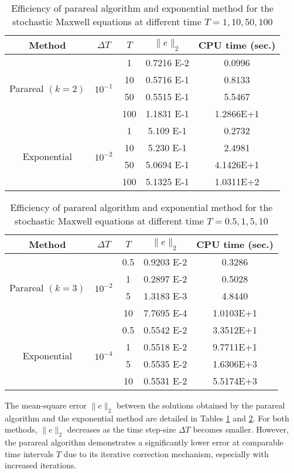 \documentclass[preprint,12pt]{elsarticle}
\begin{document}
\begin{table}[h]
	\centering
	\begin{tabular}{|c|c|c|c|c|}
		\hline Method &  $\Delta T$  & $T$ &  $\|e\|_{2}$  & CPU time (sec.) \\
		\hline \multirow{4}{*}{Parareal $(k=2)$}
		& \multirow{4}{*}{$10^{-1}$} & 1  & 0.7216 E-2 & 0.0996 \\
		& & 10 & 0.5716 E-1 & 0.8133 \\
		& & 50 & 0.5515 E-1 & 5.5467 \\
		& & 100 & 1.1831 E-1 & 1.2866E+1 \\
		\hline \multirow{4}{*}{Exponential} 
		& \multirow{4}{*}{$10^{-2}$} &  1  & 5.109 E-1 & 0.2732 \\
		& &  10 & 5.230 E-1 & 2.4981 \\
		& & 50  & 5.0694 E-1 & 4.1426E+1 \\
		& & 100 & 5.1325 E-1 & 1.0311E+2 \\
		\hline 
	\end{tabular}
	\caption{Efficiency of parareal algorithm  and exponential method for the stochastic Maxwell equations  at different time $T=1,10,50,100$}
	\label{table1}
\end{table}
\begin{table}[htbp]
	\centering
	\begin{tabular}{|c|c|c|c|c|}
		\hline Method &  $\Delta T$  & $T$ &  $\|e\|_{2}$  & CPU time (sec.) \\
		\hline \multirow{4}{*}{Parareal $(k=3)$}
		& \multirow{4}{*}{$10^{-2}$} & 0.5 & 0.9203 E-2 & 0.3286  \\
		& & 1  & 0.2897 E-2 & 0.5028\\
		& & 5  & 1.3183 E-3 & 4.8440 \\
		& & 10 & 7.7695 E-4 & 1.0103E+1\\
		\hline \multirow{4}{*}{Exponential} 
		& \multirow{4}{*}{$10^{-4}$} & 0.5 & 0.5542 E-2 & 3.3512E+1 \\
		& & 1  & 0.5518 E-2 & 9.7711E+1 \\
		& & 5  & 0.5535 E-2 & 1.6306E+3 \\
		& & 10 & 0.5531 E-2 & 5.5174E+3 \\
		\hline 
	\end{tabular}
	\caption{Efficiency of parareal algorithm  and exponential method for the stochastic Maxwell equations  at different time $T=0.5,1,5,10$}
	\label{table2}
\end{table}

The  mean-square error $\|e\|_2$ between the solutions obtained by the parareal algorithm and the exponential method are detailed in Tables \ref{table1} and \ref{table2}. For both methods, $\|e\|_2$ decreases as the time step-size $\Delta T$ becomes smaller. However, the parareal algorithm demonstrates a significantly lower error at comparable time intervals $T$ due to its iterative correction mechanism, especially with increased iterations.
\end{document}
